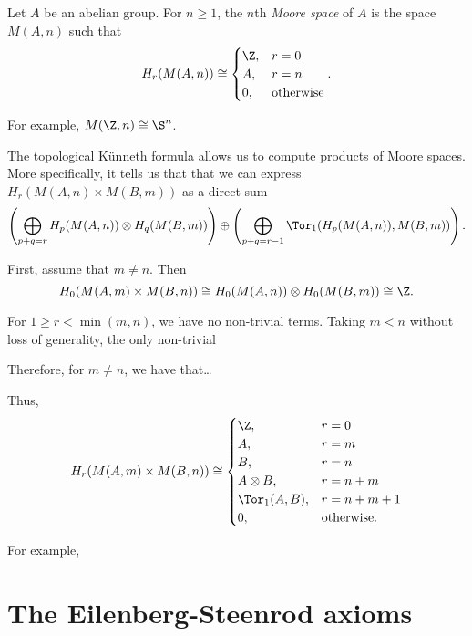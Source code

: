 \documentclass[main.tex]{subfiles}
\begin{document}
\begin{example}
  Let \(A\) be an abelian group. For \(n \geq 1\), the \(n\)th \emph{Moore space} of \(A\) is the space \(M(A, n)\) such that
  \begin{equation*}
    H_{r}(M(A, n)) \cong
    \begin{cases}
      \Z, &r = 0 \\
      A, &r = n \\
      0, &\text{otherwise}
    \end{cases}.
  \end{equation*}

  For example, \(M(\Z, n) \cong \S^{n}\).

  The topological Künneth formula allows us to compute products of Moore spaces. More specifically, it tells us that that we can express \(H_{r}(M(A, n) \times M(B, m))\) as a direct sum
  \begin{equation*}
    \left( \bigoplus_{p + q = r} H_{p}(M(A, n)) \otimes H_{q}(M(B, m)) \right) \oplus \left( \bigoplus_{p + q = r-1} \Tor_{1}(H_{p}(M(A, n)), M(B, m)) \right).
  \end{equation*}

  First, assume that \(m \neq n\). Then
  \begin{equation*}
    H_{0}(M(A, m) \times M(B, n)) \cong H_{0}(M(A, n)) \otimes H_{0}(M(B, m)) \cong \Z.
  \end{equation*}

  For \(1 \geq r < \min(m, n)\), we have no non-trivial terms. Taking \(m < n\) without loss of generality, the only non-trivial

  Therefore, for \(m \neq n\), we have that\dots

  Thus,
  \begin{equation*}
    H_{r}(M(A, m) \times M(B, n)) \cong
    \begin{cases}
      \Z, &r = 0 \\
      A, & r = m \\
      B, &r = n \\
      A \otimes B, &r = n+m \\
      \Tor_{1}(A, B), &r = n+m+1 \\
      0, & \text{otherwise}.
    \end{cases}
  \end{equation*}

  For example,
\end{example}


\section{The Eilenberg-Steenrod axioms}
\label{sec:the_eilenberg_steenrod_axioms}
\end{document}
